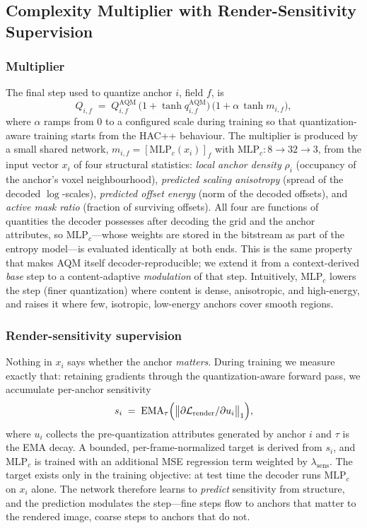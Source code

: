\documentclass[conference]{IEEEtran}
\begin{document}
\subsection{Complexity Multiplier with Render-Sensitivity Supervision}
\label{sec:multiplier}

\subsubsection{Multiplier}
The final step used to quantize anchor $i$, field $f$, is
\begin{equation}
Q_{i,f} \;=\; Q^{\mathrm{AQM}}_{i,f}\,
\bigl(1+\tanh q^{\mathrm{AQM}}_{i,f}\bigr)\,
\bigl(1+\alpha\,\tanh m_{i,f}\bigr),
\label{eq:q}
\end{equation}
where $\alpha$ ramps from $0$ to a configured scale during training so that
quantization-aware training starts from the HAC++ behaviour. The multiplier is
produced by a small shared network, $m_{i,f}=[\mathrm{MLP}_c(x_i)]_{f}$ with
$\mathrm{MLP}_c: 8{\to}32{\to}3$, from the input vector $x_i$ of four structural
statistics: \emph{local anchor density} $\rho_i$ (occupancy of the anchor's voxel
neighbourhood), \emph{predicted scaling anisotropy} (spread of the decoded
$\log$-scales), \emph{predicted offset energy} (norm of the decoded offsets), and
\emph{active mask ratio} (fraction of surviving offsets). All four are functions of
quantities the decoder possesses after decoding the grid and the anchor attributes,
so $\mathrm{MLP}_c$---whose weights are stored in the bitstream as part of the
entropy model---is evaluated identically at both ends. This is the same property
that makes AQM itself decoder-reproducible; we extend it from a context-derived
\emph{base} step to a content-adaptive \emph{modulation} of that step. Intuitively,
$\mathrm{MLP}_c$ lowers the step (finer quantization) where content is dense,
anisotropic, and high-energy, and raises it where few, isotropic, low-energy
anchors cover smooth regions.

\subsubsection{Render-sensitivity supervision}
Nothing in $x_i$ says whether the anchor \emph{matters}. During training we measure
exactly that: retaining gradients through the quantization-aware forward pass, we
accumulate per-anchor sensitivity
\begin{equation}
s_i \;=\; \mathrm{EMA}_\tau\Bigl(\bigl\lVert \partial \mathcal{L}_{\mathrm{render}}
/ \partial u_i \bigr\rVert_1\Bigr),
\label{eq:sens}
\end{equation}
where $u_i$ collects the pre-quantization attributes generated by anchor $i$ and
$\tau$ is the EMA decay. A bounded, per-frame-normalized target is derived from
$s_i$, and $\mathrm{MLP}_c$ is trained with an additional MSE regression term
weighted by $\lambda_{\mathrm{sens}}$. The target exists only in the training
objective: at test time the decoder runs $\mathrm{MLP}_c$ on $x_i$ alone. The
network therefore learns to \emph{predict} sensitivity from structure, and the
prediction modulates the step---fine steps flow to anchors that matter to the
rendered image, coarse steps to anchors that do not.
\end{document}
